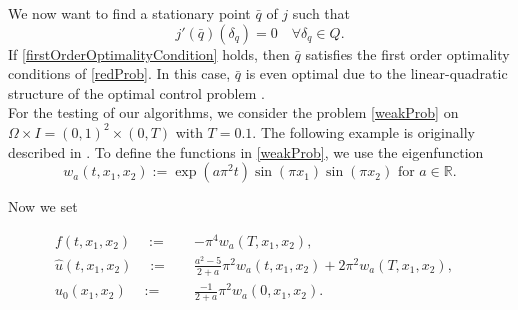 We now want to find a stationary point $\bar{q}$ of $j$ such that
\begin{equation}
\label{firstOrderOptimalityCondition}
j'(\bar{q})(\delta_q)=0\quad\forall \delta_q\in Q.
\end{equation}
If \eqref{firstOrderOptimalityCondition} holds, then $\bar{q}$ satisfies the first order optimality conditions of \eqref{redProb}. In this case, $\bar{q}$ is even optimal due to the linear-quadratic structure of the optimal control problem \cite{doi:10.1137/070694016}.\\

For the testing of our algorithms, we consider the problem \eqref{weakProb} on $\Omega\times I=(0,1)^2\times(0,T)$ with $T=0.1$. The following example is originally described in \cite{doi:10.1137/070694016}. To define the functions in \eqref{weakProb}, we use the eigenfunction
\begin{displaymath}
w_a(t,x_1,x_2):=\exp(a\pi^2t)\sin(\pi x_1)\sin(\pi x_2) \text{ for } a\in\mathbb{R}.
\end{displaymath}

Now we set

\begin{equation}
\label{exampleProblemDefinitions}
\begin{aligned}
f(t,x_1,x_2)\quad:=\quad&-\pi^4w_a(T,x_1,x_2),&\\
\hat{u}(t,x_1,x_2)\quad:=\quad&\frac{a^2-5}{2+a}\pi^2w_a(t,x_1,x_2)+2\pi^2w_a(T,x_1,x_2),&\\
u_0(x_1,x_2)\quad:=\quad&\frac{-1}{2+a}\pi^2w_a(0,x_1,x_2).&
\end{aligned}
\end{equation}

